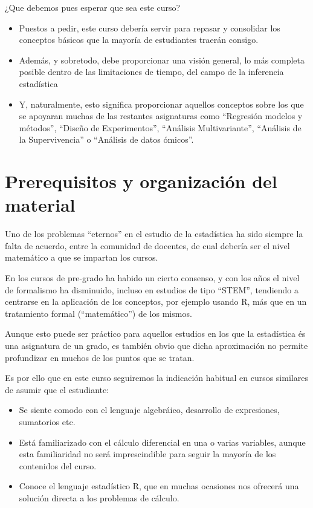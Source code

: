 \documentclass[
  a4paper,
  DIV=11,
  numbers=noendperiod]{scrreprt}
\providecommand{\tightlist}{%
  \setlength{\itemsep}{0pt}\setlength{\parskip}{0pt}}\usepackage{longtable,booktabs,array}
\begin{document}
¿Que debemos pues esperar que sea este curso?

\begin{itemize}
\tightlist
\item
  Puestos a pedir, este curso debería servir para repasar y consolidar
  los conceptos básicos que la mayoría de estudiantes traerán consigo.
\item
  Además, y sobretodo, debe proporcionar una visión general, lo más
  completa posible dentro de las limitaciones de tiempo, del campo de la
  inferencia estadística
\item
  Y, naturalmente, esto significa proporcionar aquellos conceptos sobre
  los que se apoyaran muchas de las restantes asignaturas como
  ``Regresión modelos y métodos'', ``Diseño de Experimentos'',
  ``Análisis Multivariante'', ``Análisis de la Supervivencia'' o
  ``Análisis de datos ómicos''.
\end{itemize}

\section*{Prerequisitos y organización del
material}\label{prerequisitos-y-organizaciuxf3n-del-material}


Uno de los problemas ``eternos'' en el estudio de la estadística ha sido
siempre la falta de acuerdo, entre la comunidad de docentes, de cual
debería ser el nivel matemático a que se impartan los cursos.

En los cursos de pre-grado ha habido un cierto consenso, y con los años
el nivel de formalismo ha disminuido, incluso en estudios de tipo
``STEM'', tendiendo a centrarse en la aplicación de los conceptos, por
ejemplo usando R, más que en un tratamiento formal (``matemático'') de
los mismos.

Aunque esto puede ser práctico para aquellos estudios en los que la
estadística és una asignatura de un grado, es también obvio que dicha
aproximación no permite profundizar en muchos de los puntos que se
tratan.

Es por ello que en este curso seguiremos la indicación habitual en
cursos similares de asumir que el estudiante:

\begin{itemize}
\tightlist
\item
  Se siente comodo con el lenguaje algebráico, desarrollo de
  expresiones, sumatorios etc.
\item
  Está familiarizado con el cálculo diferencial en una o varias
  variables, aunque esta familiaridad no será imprescindible para seguir
  la mayoría de los contenidos del curso.
\item
  Conoce el lenguaje estadístico R, que en muchas ocasiones nos ofrecerá
  una solución directa a los problemas de cálculo.
\end{itemize}
\end{document}
